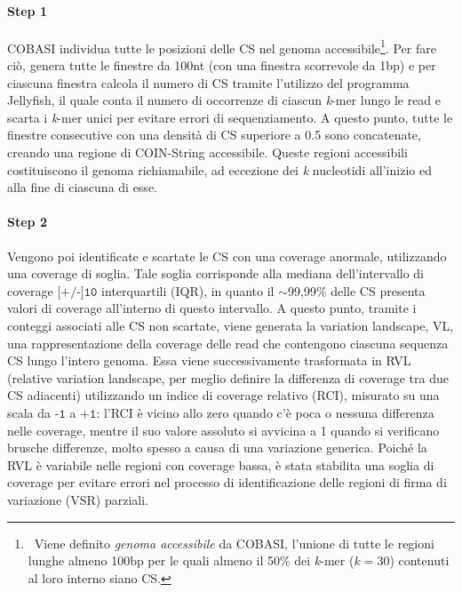 \documentclass[../main.tex]{subfiles}
\begin{document}
\paragraph{Step 1} COBASI individua tutte le posizioni delle CS nel genoma accessibile\footnote{\ Viene definito \textit{genoma accessibile} da COBASI, l'unione di tutte le regioni lunghe almeno 100bp per le quali almeno il 50\% dei \textit{k}-mer ($k = 30$) contenuti al loro interno siano CS.}. Per fare ciò, genera tutte le finestre da 100nt (con una finestra scorrevole da 1bp) e per ciascuna finestra calcola il numero di CS tramite l'utilizzo del programma Jellyfish, il quale conta il numero di occorrenze di ciascun \textit{k}-mer lungo le read e scarta i \textit{k}-mer unici per evitare errori di sequenziamento. A questo punto, tutte le finestre consecutive con una densità di CS superiore a 0.5 sono concatenate, creando una regione di COIN-String accessibile. Queste regioni accessibili costituiscono il genoma richiamabile, ad eccezione dei \textit{k} nucleotidi all'inizio ed alla fine di ciascuna di esse.

\paragraph{Step 2} Vengono poi identificate e scartate le CS con una coverage anormale, utilizzando una coverage di soglia. Tale soglia corrisponde alla mediana dell'intervallo di coverage $\texttt{[+/-]10}$ interquartili (IQR), in quanto il $\sim$99,99\% delle CS presenta valori di coverage all'interno di questo intervallo. A questo punto, tramite i conteggi associati alle CS non scartate, viene generata la variation landscape, VL, una rappresentazione della coverage delle read che contengono ciascuna sequenza CS lungo l'intero genoma. Essa viene successivamente trasformata in RVL (relative variation landscape, per meglio definire la differenza di coverage tra due CS adiacenti) utilizzando un indice di coverage relativo (RCI), misurato su una scala da $\texttt{-1}$ a $\texttt{+1}$: l'RCI è vicino allo zero quando c'è poca o nessuna differenza nelle coverage, mentre il suo valore assoluto si avvicina a 1 quando si verificano brusche differenze, molto spesso a causa di una variazione generica. Poiché la RVL è variabile nelle regioni con coverage bassa, è stata stabilita una soglia di coverage per evitare errori nel processo di identificazione delle regioni di firma di variazione (VSR) parziali.
\end{document}
